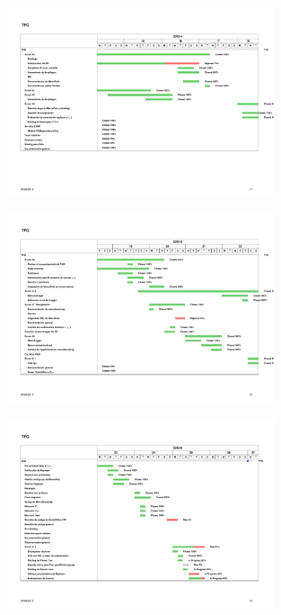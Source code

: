 \begin{figure}[H]
\centering
\includegraphics[width=0.7\textwidth]{Chapters/Chapter3/Figures/tfg-gantt-apr}
\end{figure}
\begin{figure}[H]
\centering
\includegraphics[width=0.7\textwidth]{Chapters/Chapter3/Figures/tfg-gantt-may}
\end{figure}
\begin{figure}[H]
\centering
\includegraphics[width=0.7\textwidth]{Chapters/Chapter3/Figures/tfg-gantt-jun}
\end{figure}
